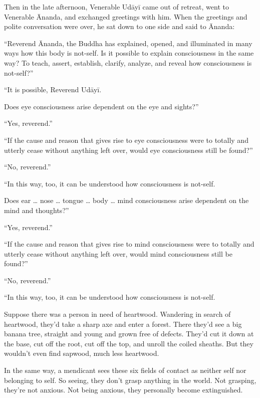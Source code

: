 \documentclass[12pt,openany]{book}%
\begin{document}
Then in the late afternoon, Venerable \textsanskrit{Udāyī} came out of retreat, went to Venerable Ānanda, and exchanged greetings with him. When the greetings and polite conversation were over, he sat down to one side and said to Ānanda: 

“Reverend Ānanda, the Buddha has explained, opened, and illuminated in many ways how this body is not-self. Is it possible to explain consciousness in the same way? To teach, assert, establish, clarify, analyze, and reveal how consciousness is not-self?” 

“It is possible, Reverend \textsanskrit{Udāyī}. 

Does eye consciousness arise dependent on the eye and sights?” 

“Yes, reverend.” 

“If the cause and reason that gives rise to eye consciousness were to totally and utterly cease without anything left over, would eye consciousness still be found?” 

“No, reverend.” 

“In this way, too, it can be understood how consciousness is not-self. 

Does ear … nose … tongue … body … mind consciousness arise dependent on the mind and thoughts?” 

“Yes, reverend.” 

“If the cause and reason that gives rise to mind consciousness were to totally and utterly cease without anything left over, would mind consciousness still be found?” 

“No, reverend.” 

“In this way, too, it can be understood how consciousness is not-self. 

Suppose there was a person in need of heartwood. Wandering in search of heartwood, they’d take a sharp axe and enter a forest. There they’d see a big banana tree, straight and young and grown free of defects. They’d cut it down at the base, cut off the root, cut off the top, and unroll the coiled sheaths. But they wouldn’t even find sapwood, much less heartwood. 

In the same way, a mendicant sees these six fields of contact as neither self nor belonging to self. So seeing, they don’t grasp anything in the world. Not grasping, they’re not anxious. Not being anxious, they personally become extinguished. 
\end{document}
